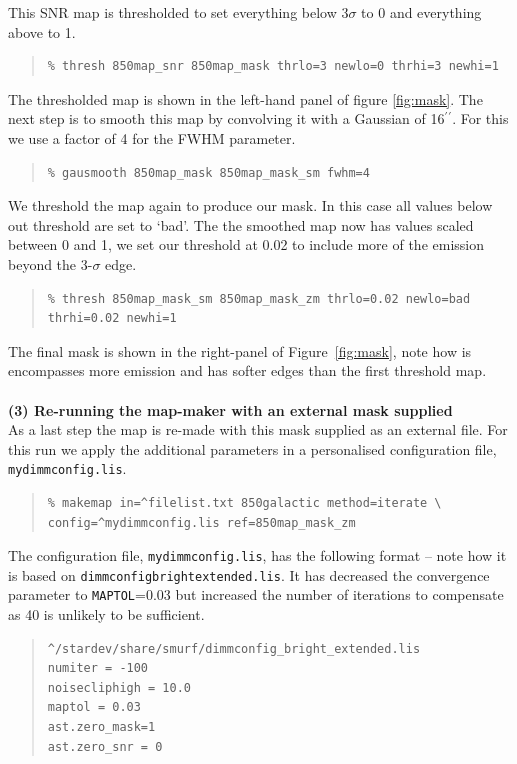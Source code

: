 \documentclass[twoside,11pt]{article}
\renewcommand{\_}{\texttt{\symbol{95}}}
\newcommand{\arcmin}{\mbox{$^\prime$}}
\newcommand{\arcsec}{\arcmin\hspace*{-0.1em}\arcmin}
\newenvironment{myquote}{\begin{quote}\begin{small}}{\end{small}\end{quote}}
\begin{document}
This SNR map is thresholded to set everything below 3$\sigma$ to 0 and
everything above to 1.

\begin{myquote}
\begin{verbatim}
% thresh 850map_snr 850map_mask thrlo=3 newlo=0 thrhi=3 newhi=1
\end{verbatim}
\end{myquote}
The thresholded map is shown in the left-hand panel of figure
\ref{fig:mask}. The next step is to smooth this map by convolving it
with a Gaussian of 16\arcsec. For this we use a factor of 4 for the FWHM
parameter.

\begin{myquote}
\begin{verbatim}
% gausmooth 850map_mask 850map_mask_sm fwhm=4
\end{verbatim}
\end{myquote}

We threshold the map again to produce our mask. In this case all
values below out threshold are set to `bad'. The the smoothed map now
has values scaled between 0 and 1, we set our threshold at 0.02 to
include more of the emission beyond the 3-$\sigma$ edge.
\begin{myquote}
\begin{verbatim}
% thresh 850map_mask_sm 850map_mask_zm thrlo=0.02 newlo=bad thrhi=0.02 newhi=1
\end{verbatim}
\end{myquote}
The final mask is shown in the right-panel of Figure~\ref{fig:mask},
note how is encompasses more emission and has softer edges than the
first threshold map.
\\ \\
\textbf{(3) Re-running the map-maker with an external mask supplied}\\
As a last step the map is re-made with this mask supplied as an external
file. For this run we apply the additional parameters in a
personalised configuration file, \texttt{mydimmconfig.lis}.
\begin{myquote}
\begin{verbatim}
% makemap in=^filelist.txt 850galactic method=iterate \
config=^mydimmconfig.lis ref=850map_mask_zm
\end{verbatim}
\end{myquote}

The configuration file, \texttt{mydimmconfig.lis}, has the following
format -- note how it is based on
\texttt{dimmconfig\_bright\_extended.lis}. It has decreased the
convergence parameter to \texttt{MAPTOL}=0.03 but increased the number
of iterations to compensate as 40 is unlikely to be sufficient.
\begin{myquote}
\begin{verbatim}
^/stardev/share/smurf/dimmconfig_bright_extended.lis
numiter = -100
noisecliphigh = 10.0
maptol = 0.03
ast.zero_mask=1
ast.zero_snr = 0
\end{verbatim}
\end{myquote}
\end{document}
